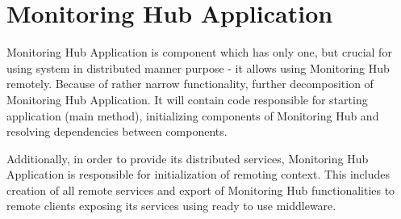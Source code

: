 %
\section{Monitoring Hub Application}
\label{sec:arch_monitoring_hub_application}

Monitoring Hub Application is component which has only one, but crucial for using system in distributed manner purpose - it allows using Monitoring Hub remotely. Because of rather narrow functionality, further decomposition of Monitoring Hub Application. It will contain code responsible for starting application (main method), initializing components of Monitoring Hub and resolving dependencies between components.

Additionally, in order to provide its distributed services, Monitoring Hub Application is responsible for initialization of remoting context. This includes creation of all remote services and export of Monitoring Hub functionalities to remote clients exposing its services using ready to use middleware. 

